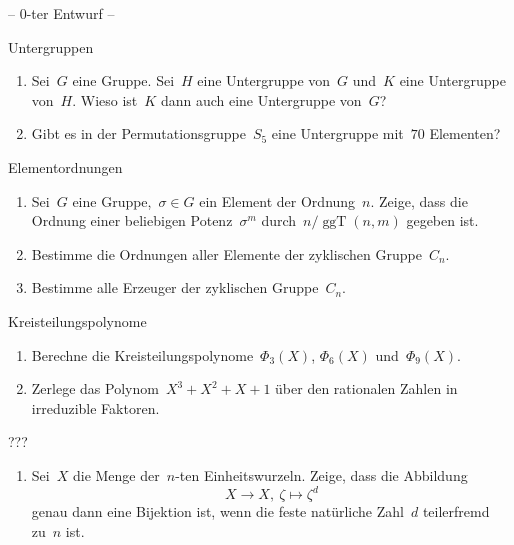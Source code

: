 \documentclass{algblatt}
\begin{document}
\vspace*{-1.5cm}

\vspace*{-1cm}
\begin{center}-- 0-ter Entwurf --\end{center}

\begin{aufgabe}{Untergruppen}
\begin{enumerate}
\item Sei~$G$ eine Gruppe. Sei~$H$ eine Untergruppe von~$G$ und~$K$ eine
Untergruppe von~$H$. Wieso ist~$K$ dann auch eine Untergruppe von~$G$?

\item Gibt es in der Permutationsgruppe~$S_5$ eine Untergruppe mit~$70$
Elementen?
\end{enumerate}
\end{aufgabe}

\begin{aufgabe}{Elementordnungen}
\begin{enumerate}
\item Sei~$G$ eine Gruppe,~$\sigma \in G$ ein Element der Ordnung~$n$.
Zeige, dass die Ordnung einer beliebigen Potenz~$\sigma^m$ durch~$n /
\operatorname{ggT}(n,m)$ gegeben ist.

\item Bestimme die Ordnungen aller Elemente der zyklischen Gruppe~$C_n$.

\item Bestimme alle Erzeuger der zyklischen Gruppe~$C_n$.
\end{enumerate}
\end{aufgabe}

\begin{aufgabe}{Kreisteilungspolynome}
\begin{enumerate}
\item Berechne die Kreisteilungspolynome~$\Phi_3(X)$, $\Phi_6(X)$
und~$\Phi_9(X)$.

\item Zerlege das Polynom~$X^3 + X^2 + X + 1$ über den rationalen Zahlen
in irreduzible Faktoren.
\end{enumerate}
\end{aufgabe}

\begin{aufgabe}{???}
\begin{enumerate}
\item Sei~$X$ die Menge der~$n$-ten Einheitswurzeln. Zeige, dass die Abbildung
\[ X \longrightarrow X,\ \zeta \longmapsto \zeta^d \]
genau dann eine Bijektion ist, wenn die feste natürliche Zahl~$d$ teilerfremd
zu~$n$ ist.
\end{enumerate}
\end{aufgabe}
\end{document}
